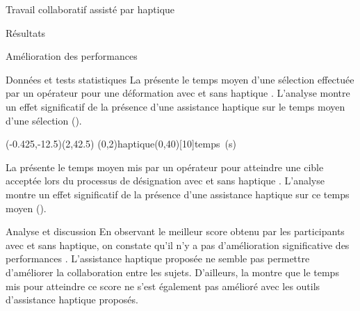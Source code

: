 \documentclass[myfrancais,ngerman,english,frenchb]{mythesis}
\begin{document}
\begin{mychapter}{Travail collaboratif assisté par haptique}
\begin{mysection}{Résultats}
\begin{mysubsection}{Amélioration des performances}
\begin{mysubsubsection}{Données et tests statistiques}
					La  présente le temps moyen d'une sélection effectuée par un opérateur pour une déformation avec et sans haptique .
					L'analyse montre un effet significatif de la présence d'une assistance haptique  sur le temps moyen d'une sélection ().

					\begin{myfigure}
						\begin{myps}(-0.425,-12.5)(2,42.5)
							\myaxes(0,2){haptique}(0,40)[10]{temps~(s)}
						\end{myps}
					\end{myfigure}

					La  présente le temps moyen mis par un opérateur pour atteindre une cible acceptée lors du processus de désignation avec et sans haptique .
					L'analyse montre un effet significatif de la présence d'une assistance haptique  sur ce temps moyen ().
				\end{mysubsubsection}
				\begin{mysubsubsection}{Analyse et discussion}
					En observant le meilleur score  obtenu par les participants avec et sans haptique, on constate qu'il n'y a pas d'amélioration significative des performances .
					L'assistance haptique proposée ne semble pas permettre d'améliorer la collaboration entre les sujets.
					D'ailleurs, la  montre que le temps mis pour atteindre ce score ne s'est également pas amélioré avec les outils d'assistance haptique proposés.


\end{mysubsubsection}
\end{mysubsection}
\end{mysection}
\end{mychapter}
\end{document}
